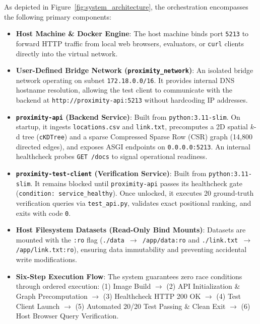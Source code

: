 \documentclass[11pt,a4paper]{article}
\begin{document}
As depicted in Figure~\ref{fig:system_architecture}, the orchestration encompasses the following primary components:
\begin{itemize}[itemsep=2pt, topsep=3pt]
    \item \textbf{Host Machine \& Docker Engine}: The host machine binds port \texttt{5213} to forward HTTP traffic from local web browsers, evaluators, or \texttt{curl} clients directly into the virtual network.
    \item \textbf{User-Defined Bridge Network (\texttt{proximity\_network})}: An isolated bridge network operating on subnet \texttt{172.18.0.0/16}. It provides internal DNS hostname resolution, allowing the test client to communicate with the backend at \texttt{http://proximity-api:5213} without hardcoding IP addresses.
    \item \textbf{\texttt{proximity-api} (Backend Service)}: Built from \texttt{python:3.11-slim}. On startup, it ingests \texttt{locations.csv} and \texttt{link.txt}, precomputes a 2D spatial $k$-d tree (\texttt{cKDTree}) and a sparse Compressed Sparse Row (CSR) graph (14,800 directed edges), and exposes ASGI endpoints on \texttt{0.0.0.0:5213}. An internal healthcheck probes \texttt{GET /docs} to signal operational readiness.
    \item \textbf{\texttt{proximity-test-client} (Verification Service)}: Built from \texttt{python:3.11-slim}. It remains blocked until \texttt{proximity-api} passes its healthcheck gate (\texttt{condition: service\_healthy}). Once unlocked, it executes 20 ground-truth verification queries via \texttt{test\_api.py}, validates exact positional ranking, and exits with code \texttt{0}.
    \item \textbf{Host Filesystem Datasets (Read-Only Bind Mounts)}: Datasets are mounted with the \texttt{:ro} flag (\texttt{./data $\to$ /app/data:ro} and \texttt{./link.txt $\to$ /app/link.txt:ro}), ensuring data immutability and preventing accidental write modifications.
    \item \textbf{Six-Step Execution Flow}: The system guarantees zero race conditions through ordered execution: (1) Image Build $\to$ (2) API Initialization \& Graph Precomputation $\to$ (3) Healthcheck HTTP 200 OK $\to$ (4) Test Client Launch $\to$ (5) Automated 20/20 Test Passing \& Clean Exit $\to$ (6) Host Browser Query Verification.
\end{itemize}

\end{document}
